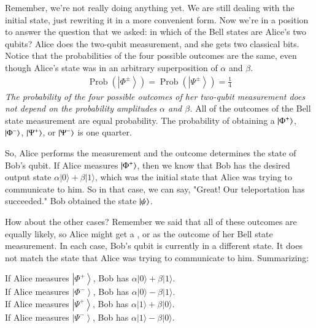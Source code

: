 Remember, we're not really doing anything yet.  We are still dealing with the initial state, just rewriting it in a more convenient form. Now we're in a position to answer the question that we asked: in which of the Bell states are Alice's two qubits? Alice does the two-qubit measurement, and she gets two classical bits. Notice that the probabilities of the four possible outcomes are the same, even though Alice's state was in an arbitrary superposition of $\alpha$ and $\beta$.
\begin{align}
\operatorname{Prob}\left(\left|\Phi^{\pm}\right\rangle\right)=\operatorname{Prob}\left(\left|\Psi^{\pm}\right\rangle\right)=\frac{1}{4}
\end{align}
\emph{The probability of the four possible outcomes of her two-qubit measurement does not depend on the probability amplitudes $\alpha$ and $\beta$.} All of the outcomes of the Bell state measurement are equal probability. The probability of obtaining a $\left| \Phi^+ \right\rangle$, $\left| \Phi^- \right\rangle$, $\left| \Psi^+ \right\rangle$, or $\left| \Psi^- \right\rangle$ is one quarter.

So, Alice performs the measurement and the outcome determines the state of Bob's qubit. If Alice measures $\left| \Phi^+ \right\rangle$, then we know that Bob has the desired output state $\alpha|0\rangle+\beta|1\rangle$, which was the initial state that Alice was trying to communicate to him. So in that case, we can say, "Great! Our teleportation has succeeded." Bob obtained the state $\left| \psi \right\rangle$.

How about the other cases? Remember we said that all of these outcomes are equally likely, so Alice might get a \ket{\Phi^-}, \ket{\Psi^+} or \ket{\Psi^-} as the outcome of her Bell state measurement. In each case, Bob's qubit is currently in a different state. It does not match the state \ket{\psi} that Alice was trying to communicate to him.  Summarizing:

\noindent
If Alice measures $\left|\Phi^{+}\right\rangle$, Bob has $\alpha|0\rangle+\beta|1\rangle$.\\
If Alice measures $\left|\Phi^{-}\right\rangle$, Bob has $\alpha|0\rangle-\beta|1\rangle$.\\
If Alice measures $\left|\Psi^{+}\right\rangle$, Bob has $\alpha|1\rangle+\beta|0\rangle$.\\
If Alice measures $\left|\Psi^{-}\right\rangle$, Bob has $\alpha|1\rangle-\beta|0\rangle$.

